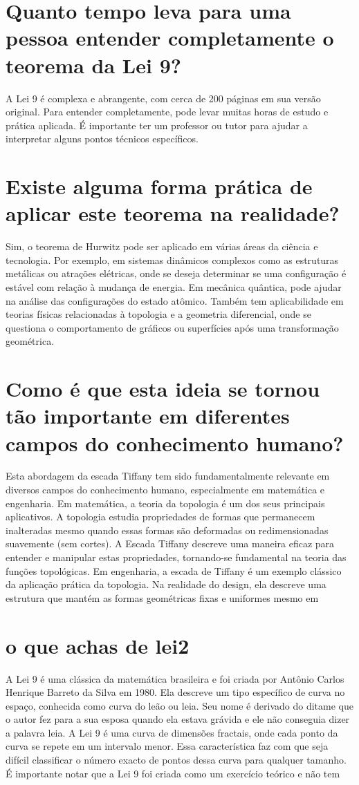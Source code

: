 \documentclass[11pt,a4paper]{article}
\begin{document}
\section{Quanto tempo leva para uma pessoa entender completamente o teorema da Lei 9?}
A Lei 9 é complexa e abrangente, com cerca de 200 páginas em sua versão original. Para entender completamente, pode levar muitas horas de estudo e prática aplicada. É importante ter um professor ou tutor para ajudar a interpretar alguns pontos técnicos específicos.

\section{Existe alguma forma prática de aplicar este teorema na realidade?}
Sim, o teorema de Hurwitz pode ser aplicado em várias áreas da ciência e tecnologia. Por exemplo, em sistemas dinâmicos complexos como as estruturas metálicas ou atrações elétricas, onde se deseja determinar se uma configuração é estável com relação à mudança de energia. Em mecânica quântica, pode ajudar na análise das configurações do estado atômico. Também tem aplicabilidade em teorias físicas relacionadas à topologia e a geometria diferencial, onde se questiona o comportamento de gráficos ou superfícies após uma transformação geométrica.

\section{Como é que esta ideia se tornou tão importante em diferentes campos do conhecimento humano?}
Esta abordagem da escada Tiffany tem sido fundamentalmente relevante em diversos campos do conhecimento humano, especialmente em matemática e engenharia. Em matemática, a teoria da topologia é um dos seus principais aplicativos. A topologia estudia propriedades de formas que permanecem inalteradas mesmo quando essas formas são deformadas ou redimensionadas suavemente (sem cortes). A Escada Tiffany descreve uma maneira eficaz para entender e manipular estas propriedades, tornando-se fundamental na teoria das funções topológicas. Em engenharia, a escada de Tiffany é um exemplo clássico da aplicação prática da topologia. Na realidade do design, ela descreve uma estrutura que mantém as formas geométricas fixas e uniformes mesmo em

\section{o que achas de lei2}
A Lei 9 é uma clássica da matemática brasileira e foi criada por Antônio Carlos Henrique Barreto da Silva em 1980. Ela descreve um tipo específico de curva no espaço, conhecida como curva do leão ou leia. Seu nome é derivado do ditame que o autor fez para a sua esposa quando ela estava grávida e ele não conseguia dizer a palavra leia. A Lei 9 é uma curva de dimensões fractais, onde cada ponto da curva se repete em um intervalo menor. Essa característica faz com que seja difícil classificar o número exacto de pontos dessa curva para qualquer tamanho. É importante notar que a Lei 9 foi criada como um exercício teórico e não tem
\end{document}
